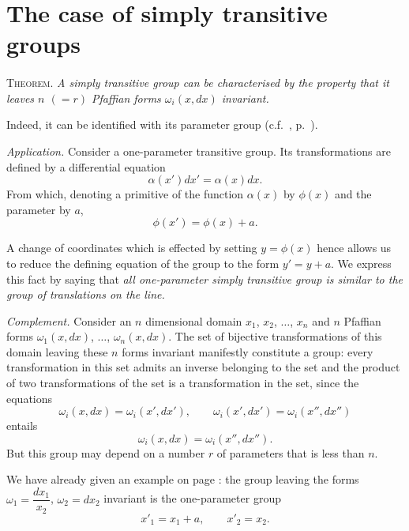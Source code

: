 \section{The case of simply transitive groups}
\label{sec:case-simply-trans}

\paragraph{}
\label{sec:106}
\textsc{Theorem.} \emph{A simply transitive group can be characterised by the property that it leaves $n$ $(=r)$ Pfaffian forms $\omega_{i}(x,dx)$ invariant.}

\somespace

Indeed, it can be identified with its parameter group (c.f.~, p.~\pageref{sec:99}).

\somespace

\emph{Application.} Consider a one-parameter transitive group. Its transformations are defined by a differential equation
\[
\alpha(x')dx'=\alpha(x)dx.
\]
From which, denoting a primitive of the function $\alpha(x)$ by $\phi(x)$ and the parameter by $a$,
\[
\phi(x')=\phi(x)+a.
\]

A change of coordinates which is effected by setting $y=\phi(x)$ hence allows us to reduce the defining equation of the group to the form $y'=y+a$. We express this fact by saying that \emph{all one-parameter simply transitive group is similar to the group of translations on the line.}

\somespace

{\small
\emph{Complement.} Consider an $n$ dimensional domain $x_{1}$, $x_{2}$, $\dots$, $x_{n}$ and $n$ Pfaffian forms $\omega_{1}(x,dx)$, $\dots$, $\omega_{n}(x,dx)$. The set of bijective transformations of this domain leaving these $n$ forms invariant manifestly constitute a group: every transformation in this set admits an inverse belonging to the set and the product of two transformations of the set is a transformation in the set, since the equations
\[
\omega_{i}(x,dx)=\omega_{i}(x',dx'),\qquad \omega_{i}(x',dx')=\omega_{i}(x'',dx'')
\]
entails
\[
\omega_{i}(x,dx)=\omega_{i}(x'',dx'').
\]
But this group may depend on a number $r$ of parameters that is less than $n$.

We have already given an example on page \pageref{sec:83}: the group leaving the forms $\omega_{1}=\dfrac{dx_{1}}{x_{2}}$, $\omega_{2}=dx_{2}$ invariant is the one-parameter group
\[
x'_{1}=x_{1}+a,\qquad x'_{2}=x_{2}.
\]}


